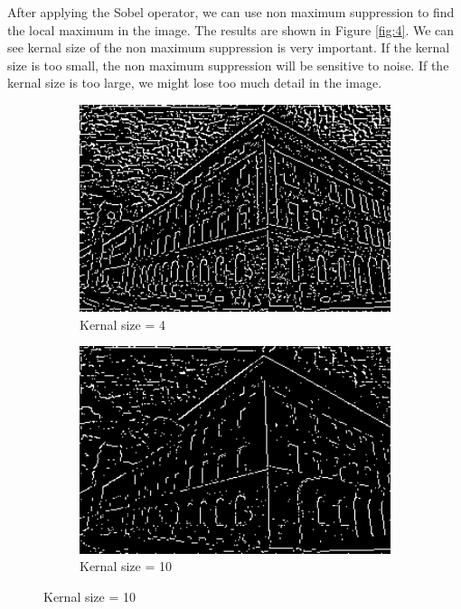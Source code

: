 \documentclass[12pt
,headinclude
,headsepline
,bibtotocnumbered
]{scrartcl}
\begin{document}
After applying the Sobel operator, we can use non maximum suppression to find the local maximum in the image. The results are shown in Figure \ref{fig:4}. We can see kernal size of the non maximum suppression is very important. If the kernal size is too small, the non maximum suppression will be sensitive to noise. If the kernal size is too large, we might lose too much detail in the image.  
\begin{figure}[H]
    \centering
    \begin{subfigure}{0.45\textwidth}
        \includegraphics[width=1\textwidth]{plots/edges_4.png}
        \caption*{Kernal size = 4}
    \end{subfigure}
    \hfill
    \begin{subfigure}{0.45\textwidth}
        \includegraphics[width=1\textwidth]{plots/edges_10.png}
        \caption*{Kernal size = 10}
    \end{subfigure}

\end{figure}
\end{document}
